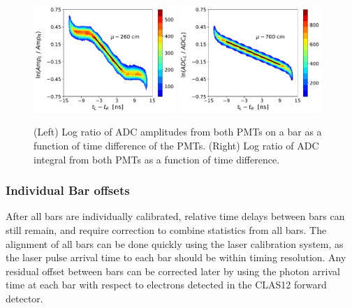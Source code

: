 \documentclass[3p,final,twocolumn]{elsarticle}
\begin{document}
\begin{figure}[tb]
	\centering
		\includegraphics[width=0.48\textwidth]{atten-amp.pdf}
		\includegraphics[width=0.48\textwidth]{atten-adc.pdf}
	\caption{(Left) Log ratio of ADC amplitudes from both PMTs on a bar as a function of time difference of the PMTs. (Right) Log ratio of ADC integral from both PMTs as a function of time difference.}
	\label{fig:atten}
\end{figure}

\subsubsection{Individual Bar offsets}
After all bars are individually calibrated, relative time delays between bars can still remain, and require correction to combine 
statistics from all bars. The alignment of all bars can be done quickly using the laser calibration system, as the laser pulse arrival 
time to each bar should be within timing resolution. Any residual offset 
between bars can be corrected later by using the photon arrival time
at each bar with respect to electrons detected in the CLAS12 forward
detector. 
\end{document}
